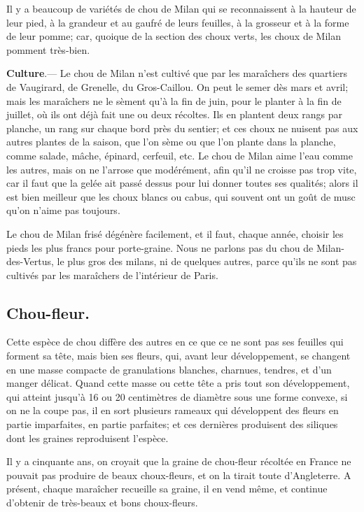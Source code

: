 \documentclass[10pt,a4paper]{book}
\begin{document}
Il y a beaucoup de variétés de chou de Milan qui se reconnaissent à la hauteur de leur pied, à la grandeur et au gaufré de leurs feuilles, à la grosseur et à la forme de leur pomme; car, quoique de la section des choux verts, les choux de Milan pomment très-bien.

\textbf{Culture}.--- Le chou de Milan n'est cultivé que par les maraîchers des quartiers de Vaugirard, de Grenelle, du Gros-Caillou. On peut le semer dès mars et avril; mais les maraîchers ne le sèment qu'à la fin de juin, pour le planter à la fin de juillet, où ils ont déjà fait une ou deux récoltes. Ils en plantent deux rangs par planche, un rang sur chaque bord près du sentier; et ces choux ne nuisent pas aux autres plantes de la saison, que l'on sème ou que l'on plante dans la planche, comme salade, mâche, épinard, cerfeuil, etc. Le chou de Milan aime l'eau comme les autres, mais on ne l'arrose que modérément, afin qu'il ne croisse pas trop vite, car il faut que la gelée ait passé dessus pour lui donner toutes ses qualités; alors il est bien meilleur que les choux blancs ou cabus, qui souvent ont un goût de musc qu'on n'aime pas toujours.

Le chou de Milan frisé dégénère facilement, et il faut, chaque année, choisir les pieds les plus francs pour porte-graine. Nous ne parlons pas du chou de Milan-des-Vertus, le plus gros des milans, ni de quelques autres, parce qu'ils ne sont pas cultivés par les maraîchers de l'intérieur de Paris.

\subsection{Chou-fleur.}

Cette espèce de chou diffère des autres en ce que ce ne sont pas ses feuilles qui forment sa tête, mais bien ses fleurs, qui, avant leur développement, se changent en une masse compacte de granulations blanches, charnues, tendres, et d'un manger délicat. Quand cette masse ou cette tête a pris tout son développement, qui atteint jusqu'à 16 ou 20 centimètres de diamètre sous une forme convexe, si on ne la coupe pas, il en sort plusieurs rameaux qui développent des fleurs en partie imparfaites, en partie parfaites; et ces dernières produisent des siliques dont les graines reproduisent l'espèce.

Il y a cinquante ans, on croyait que la graine de chou-fleur récoltée en France ne pouvait pas produire de beaux choux-fleurs, et on la tirait toute d'Angleterre. A présent, chaque maraîcher recueille sa graine, il en vend même, et continue d'obtenir de très-beaux et bons choux-fleurs.
\end{document}
